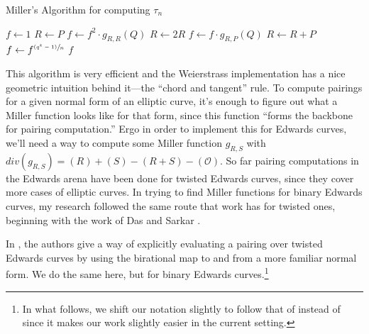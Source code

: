 \begin{Algorithm}
\caption{Miller's Algorithm for computing $\tau_n$}
\label{alg:miller}
\begin{algorithmic}
        \State $f \gets 1$
        \State $R \gets P$
            \State $f \gets f^2 \cdot g_{R,R}(Q)$
            \State $R \gets 2R$ 
                \State $f \gets f \cdot g_{R, P}(Q)$
                \State $R \gets R + P$ 
            \EndIf
        \EndFor
        \State $f \gets f^{\sfrac{(q^k - 1)}{n}}$
        \State \Return $f$
    \EndFunction
\end{algorithmic}
\end{Algorithm}

This algorithm is very efficient and the Weierstrass implementation has a nice
    geometric intuition behind it---the ``chord and tangent'' rule.
To compute pairings for a given normal form of an elliptic curve, it's enough
    to figure out what a Miller function looks like for that form, since this
    function ``forms the backbone for pairing computation.''
    \cite{das2008pairing}
Ergo in order to implement this for Edwards curves, we'll need a way to compute
    some Miller function $g_{R,S}$ with $div(g_{R,S}) = (R) + (S) - (R + S) -
    (\mathcal{O})$. 
So far pairing computations in the Edwards arena have been done for twisted
    Edwards curves, since they cover more cases of elliptic curves.
In trying to find Miller functions for binary Edwards curves, my research
    followed the same route that work has for twisted ones, beginning with the
    work of Das and Sarkar \cite{das2008pairing}.


In \cite{das2008pairing}, the authors give a way of explicitly evaluating a
    pairing over twisted Edwards curves by using the birational map to and from
    a more familiar normal form.
We do the same here, but for binary Edwards curves.\footnote{In what follows,
    we shift our notation slightly to follow that of \cite{das2008pairing}
    instead of \cite{arene2011faster} since it makes our work slightly easier
    in the current setting.}

